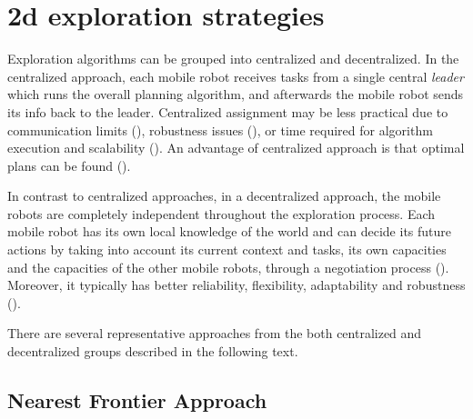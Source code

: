 \section{2d exploration strategies}

Exploration algorithms can be grouped into centralized and decentralized. In the  centralized approach, each mobile robot receives tasks from a single central \emph{leader} which runs the overall planning algorithm, and afterwards the mobile robot sends its info back to the leader. Centralized assignment may be less practical due to communication limits (\cite{Dias2000}), robustness issues (\cite{Dias2006}), or time required for algorithm execution and scalability (\cite{Julia2012}). An advantage of centralized approach is that optimal plans can be found (\cite{Yan2011}). 

In contrast to centralized approaches, in a decentralized approach, the mobile robots are completely independent throughout the exploration process. Each mobile robot has its own local knowledge of the world and can decide its future actions by taking into account its current context and tasks, its own capacities and the capacities of the other mobile robots, through a negotiation process (\cite{Yan2013}). Moreover, it typically has better reliability, flexibility, adaptability and robustness (\cite{Zlot2002}). 
 
There are several representative approaches from the both centralized and decentralized groups described in the following text. 



\subsection{Nearest Frontier Approach} 

